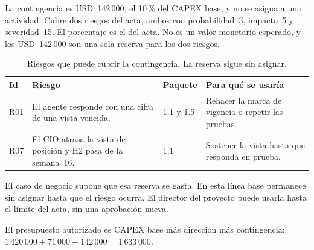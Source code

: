 \documentclass[11pt,a4paper]{article}
\newcommand{\usd}[1]{USD~#1}
\begin{document}
La contingencia es \usd{142\,000}, el 10\,\% del CAPEX base, y no se asigna a una actividad. Cubre dos riesgos del acta, ambos con probabilidad~3, impacto~5 y severidad~15. El porcentaje es el del acta. No es un valor monetario esperado, y los \usd{142\,000} son una sola reserva para los dos riesgos.

\begin{table}[H]
\centering
\caption{Riesgos que puede cubrir la contingencia. La reserva sigue sin asignar.}
\small
\begin{tabularx}{\textwidth}{@{}l X l X@{}}
\toprule
\textbf{Id} & \textbf{Riesgo} & \textbf{Paquete} & \textbf{Para qué se usaría} \\
\midrule
R01 & El agente responde con una cifra de una vista vencida. & 1.1 y 1.5 & Rehacer la marca de vigencia o repetir las pruebas. \\
R07 & El CIO atrasa la vista de posición y H2 pasa de la semana~16. & 1.1 & Sostener la vista hasta que responda en prueba. \\
\bottomrule
\end{tabularx}
\end{table}

El caso de negocio supone que esa reserva se gasta. En esta línea base permanece sin asignar hasta que el riesgo ocurra. El director del proyecto puede usarla hasta el límite del acta, sin una aprobación nueva.

El presupuesto autorizado es CAPEX base más dirección más contingencia: \(1\,420\,000 + 71\,000 + 142\,000 = 1\,633\,000\).
\end{document}
